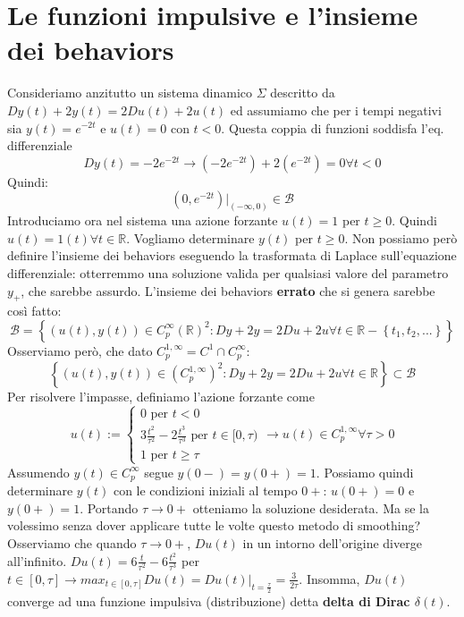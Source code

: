 \documentclass[11pt]{article}
\begin{document}
\section{Le funzioni impulsive e l'insieme dei behaviors}
Consideriamo anzitutto un sistema dinamico $\Sigma$ descritto da $Dy(t) + 2y(t) = 2Du(t)+2u(t)$ ed assumiamo che per i tempi negativi sia $y(t) = e^{-2t}$ e $u(t)=0$ con $t<0$.
Questa coppia di funzioni soddisfa l'eq. differenziale 
\begin{displaymath}
    Dy(t) = -2e^{-2t} \rightarrow (-2e^{-2t}) + 2(e^{-2t}) = 0 \forall t<0
\end{displaymath}
Quindi:
\begin{displaymath}
    \left(0, e^{-2t}\right)|_{(-\infty, 0)} \in \mathcal{B}
\end{displaymath}
Introduciamo ora nel sistema una azione forzante $u(t) = 1$ per $t \ge 0$. Quindi $u(t) = 1(t) \forall t \in \mathbb{R}$. Vogliamo determinare $y(t)$ per $t \ge 0$. Non possiamo però definire l'insieme dei behaviors eseguendo la trasformata di Laplace sull'equazione differenziale: otterremmo una soluzione valida per qualsiasi valore del parametro $y_+$, che sarebbe assurdo. L'insieme dei behaviors \textbf{errato} che si genera sarebbe così fatto:
\begin{displaymath}
    \mathcal{B}= \left\{\left(u(t), y(t)\right) \in C^\infty_p (\mathbb{R})^2 : Dy+ 2y = 2Du +2u \forall t \in \mathbb{R}-\left\{t_1,t_2,...\right\}\right\}
\end{displaymath}
Osserviamo però, che dato $C^{1, \infty}_p = C^1 \cap C_p^\infty$: 
\begin{displaymath}
    \left\{\left(u(t), y(t)\right) \in (C_p^{1,\infty})^2 : Dy + 2y = 2Du + 2u \forall t \in \mathbb{R}\right\} \subset \mathcal{B}
\end{displaymath}
Per risolvere l'impasse, definiamo l'azione forzante come 
\begin{displaymath}
    u(t) :=
    \begin{cases}
        0 \textrm{ per }t<0\\
        3\frac{t^2}{\tau^2}- 2\frac{t^3}{\tau^3} \textrm{ per }t \in [0, \tau)\\
        1 \textrm{ per } t \ge \tau
    \end{cases}
    \rightarrow u(t) \in C_p^{1,\infty} \forall \tau > 0
\end{displaymath}
Assumendo $y(t) \in C_p^\infty$ segue $y(0-) = y(0+) = 1$. Possiamo quindi determinare $y(t)$ con le condizioni iniziali al tempo $0+$: $u(0+)=0$ e $y(0+)=1$.
Portando $\tau \rightarrow 0+$ otteniamo la soluzione desiderata. Ma se la volessimo senza dover applicare tutte le volte questo metodo di smoothing?
Osserviamo che quando $\tau \rightarrow 0+$, $Du(t)$ in un intorno dell'origine diverge all'infinito. $Du(t) = 6\frac{t}{\tau^2} - 6\frac{t^2}{\tau^3}$ per $t \in [0, \tau] \rightarrow max_{t \in [0, \tau]} Du(t) = Du(t)|_{t=\frac{\tau}{2}}=\frac{3}{2\tau}$.
Insomma, $Du(t)$ converge ad una funzione impulsiva (distribuzione) detta \textbf{delta di Dirac $\delta(t)$}.
\end{document}
